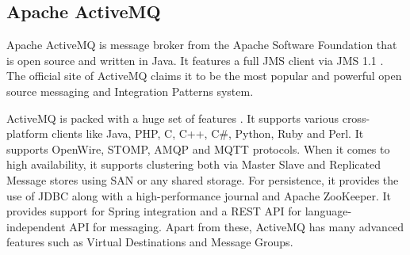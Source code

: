 \subsection{Apache ActiveMQ}

Apache ActiveMQ is message broker from the Apache Software Foundation that is open source and written in Java. It features a full JMS client via JMS 1.1 \parencite{snyderintroduction}. The official site of ActiveMQ claims it to be the most popular and powerful open source messaging and Integration Patterns system. 

ActiveMQ is packed with a huge set of features \parencite{activemq_official_site}. It supports various cross-platform clients like Java, PHP, C, C++, C#, Python, Ruby and Perl. It supports OpenWire, STOMP, AMQP and MQTT protocols. When it comes to high availability, it supports clustering both via Master Slave and Replicated Message stores using SAN or any shared storage. For persistence, it provides the use of JDBC along with a high-performance journal and Apache ZooKeeper. It provides support for Spring integration and a REST API for language-independent API for messaging. Apart from these, ActiveMQ has many advanced features such as Virtual Destinations and Message Groups.

